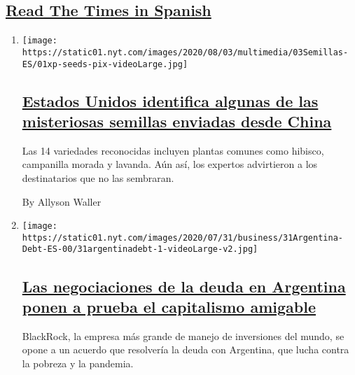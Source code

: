 \hypertarget{read-the-times-in-spanish}{%
\subsection{\texorpdfstring{\protect\hyperlink{}{Read The Times in
Spanish}}{Read The Times in Spanish}}\label{read-the-times-in-spanish}}

\begin{enumerate}
\def\labelenumi{\arabic{enumi}.}
\item
  \texttt{[image: https://static01.nyt.com/images/2020/08/03/multimedia/03Semillas-ES/01xp-seeds-pix-videoLarge.jpg]}

  \hypertarget{estados-unidos-identifica-algunas-de-las-misteriosas-semillas-enviadas-desde-china}{%
  \subsection{\texorpdfstring{\href{/es/2020/08/03/espanol/estados-unidos/semillas-correo-china.html}{Estados
  Unidos identifica algunas de las misteriosas semillas enviadas desde
  China}}{Estados Unidos identifica algunas de las misteriosas semillas enviadas desde China}}\label{estados-unidos-identifica-algunas-de-las-misteriosas-semillas-enviadas-desde-china}}

  Las 14 variedades reconocidas incluyen plantas comunes como hibisco,
  campanilla morada y lavanda. Aún así, los expertos advirtieron a los
  destinatarios que no las sembraran.

  By Allyson Waller
\item
  \texttt{[image: https://static01.nyt.com/images/2020/07/31/business/31Argentina-Debt-ES-00/31argentinadebt-1-videoLarge-v2.jpg]}

  \hypertarget{las-negociaciones-de-la-deuda-en-argentina-ponen-a-prueba-el-capitalismo-amigable}{%
  \subsection{\texorpdfstring{\href{/es/2020/07/31/espanol/negocios/argentina-deuda.html}{Las
  negociaciones de la deuda en Argentina ponen a prueba el capitalismo
  amigable}}{Las negociaciones de la deuda en Argentina ponen a prueba el capitalismo amigable}}\label{las-negociaciones-de-la-deuda-en-argentina-ponen-a-prueba-el-capitalismo-amigable}}

  BlackRock, la empresa más grande de manejo de inversiones del mundo,
  se opone a un acuerdo que resolvería la deuda con Argentina, que lucha
  contra la pobreza y la pandemia.


\end{enumerate}
